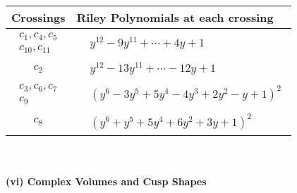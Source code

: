 \documentclass[1p]{elsarticle_modified}
\theoremstyle{definition}
\begin{document}
\begin{tabular}{m{50pt}|m{274pt}}
Crossings & \hspace{64pt}Riley Polynomials at each crossing \\
\hline $$\begin{aligned}c_{1},c_{4},c_{5}\\c_{10},c_{11}\end{aligned}$$&$\begin{aligned}
&y^{12}-9 y^{11}+\cdots+4 y+1
\end{aligned}$\\
\hline $$\begin{aligned}c_{2}\end{aligned}$$&$\begin{aligned}
&y^{12}-13 y^{11}+\cdots-12 y+1
\end{aligned}$\\
\hline $$\begin{aligned}c_{3},c_{6},c_{7}\\c_{9}\end{aligned}$$&$\begin{aligned}
&(y^6-3 y^5+5 y^4-4 y^3+2 y^2- y+1)^2
\end{aligned}$\\
\hline $$\begin{aligned}c_{8}\end{aligned}$$&$\begin{aligned}
&(y^6+y^5+5 y^4+6 y^2+3 y+1)^2
\end{aligned}$\\
\hline
\end{tabular}\\~\\
\newpage\flushleft \textbf{(vi) Complex Volumes and Cusp Shapes}
\end{document}
